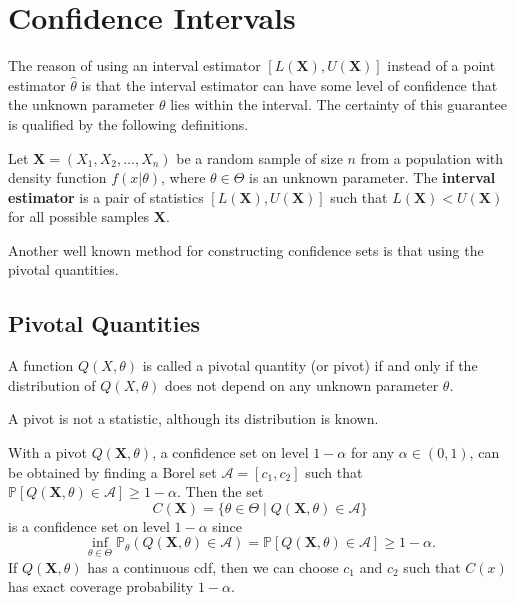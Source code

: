 \chapter{Confidence Intervals}

The reason of using an interval estimator $[L(\mathbf{X}), U(\mathbf{X})]$ 
instead of a point estimator $\widehat{\theta}$ is that the interval estimator 
can have some level of confidence that the unknown parameter $\theta$ lies within the interval. 
The certainty of this guarantee is qualified by the following definitions.

\begin{definition}
    Let $\mathbf{X} = (X_1, X_2, \ldots, X_n)$ be a random sample of size $n$ from a population with
    density function $f(x | \theta)$, where $\theta \in \Theta$ is an unknown parameter. The 
    \textbf{interval estimator} is a pair of statistics $[L(\mathbf{X}), U(\mathbf{X})]$ such that $L(\mathbf{X}) < U(\mathbf{X})$ for all possible samples $\mathbf{X}$.
\end{definition}

Another well known method for constructing confidence 
sets is that using the pivotal quantities.

\section{Pivotal Quantities}

\begin{definition}
    A function $Q(X, \theta)$ is called a pivotal quantity (or pivot) 
    if and only if the distribution of $Q(X, \theta)$ does not depend on any unknown parameter $\theta$.
\end{definition}
\begin{remark}
    A pivot is not a statistic, although its distribution is known. 
\end{remark}

With a pivot $Q(\mathbf{X}, \theta)$, a confidence set on level $1 - \alpha$ for any $\alpha \in (0,1)$, can be obtained 
by finding a Borel set $\mathcal{A} = [c_1, c_2]$ such that $\mathbb{P}[Q(\mathbf{X}, \theta) \in \mathcal{A}] \geq 1 - \alpha$.
Then the set 
\begin{equation}
    C(\mathbf{X}) = \{ \theta \in \Theta \mid Q(\mathbf{X}, \theta) \in \mathcal{A} \}
\end{equation}
is a confidence set on level $1 - \alpha$ since
\begin{equation}
    \inf_{\theta \in \Theta} \mathbb{P}_\theta(Q(\mathbf{X}, \theta) \in \mathcal{A}) = \mathbb{P}[Q(\mathbf{X}, \theta) \in \mathcal{A}] \geq 1 - \alpha.
\end{equation}
If $Q(\mathbf{X}, \theta)$ has a continuous cdf, then we can choose $c_1$ and $c_2$ such that 
$C(x)$ has exact coverage probability $1 - \alpha$.

